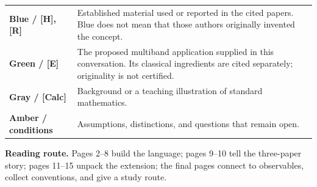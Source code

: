 \documentclass[11pt,a4paper]{article}
\begin{document}
\begin{tabularx}{\linewidth}{@{}>{\raggedright\arraybackslash}p{3.0cm}X@{}}
\textcolor{KnownBlue}{\textbf{Blue / [H], [R]}} &
Established material used or reported in the cited papers. Blue does not mean
that those authors originally invented the concept.\\[3pt]
\textcolor{ProposalGreen}{\textbf{Green / [E]}} &
The proposed multiband application supplied in this conversation.
Its classical ingredients are cited separately; originality is not certified.\\[3pt]
\textcolor{Slate}{\textbf{Gray / [Calc]}} &
Background or a teaching illustration of standard mathematics.\\[3pt]
\textcolor{CautionAmber}{\textbf{Amber / conditions}} &
Assumptions, distinctions, and questions that remain open.
\end{tabularx}
\smallskip
\textbf{Reading route.} Pages 2--8 build the language; pages 9--10 tell the
three-paper story; pages 11--15 unpack the extension; the final pages connect
to observables, collect conventions, and give a study route.
\end{document}
